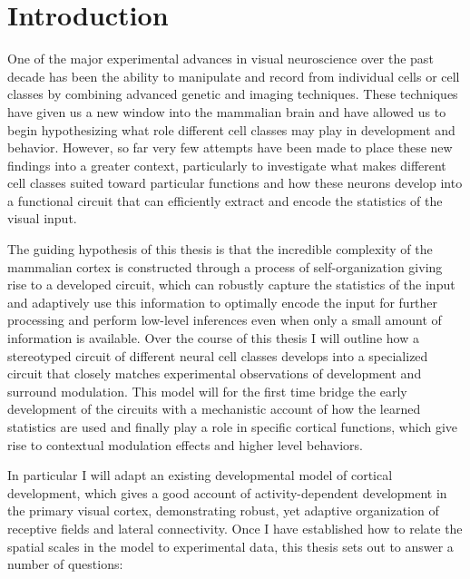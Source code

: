 \chapter{Introduction}

One of the major experimental advances in visual neuroscience over the
past decade has been the ability to manipulate and record from
individual cells or cell classes by combining advanced genetic and
imaging techniques. These techniques have given us a new window into
the mammalian brain and have allowed us to begin hypothesizing what
role different cell classes may play in development and
behavior. However, so far very few attempts have been made to place
these new findings into a greater context, particularly to investigate
what makes different cell classes suited toward particular functions
and how these neurons develop into a functional circuit that can
efficiently extract and encode the statistics of the visual input.

The guiding hypothesis of this thesis is that the incredible
complexity of the mammalian cortex is constructed through a process of
self-organization giving rise to a developed circuit, which can
robustly capture the statistics of the input and adaptively use this
information to optimally encode the input for further processing and
perform low-level inferences even when only a small amount of
information is available. Over the course of this thesis I will
outline how a stereotyped circuit of different neural cell classes
develops into a specialized circuit that closely matches experimental
observations of development and surround modulation. This model will
for the first time bridge the early development of the circuits with a
mechanistic account of how the learned statistics are used and finally
play a role in specific cortical functions, which give rise to
contextual modulation effects and higher level behaviors.

In particular I will adapt an existing developmental model of cortical
development, which gives a good account of activity-dependent
development in the primary visual cortex, demonstrating robust, yet
adaptive organization of receptive fields and lateral connectivity.
Once I have established how to relate the spatial scales in the model
to experimental data, this thesis sets out to answer a number of
questions:

